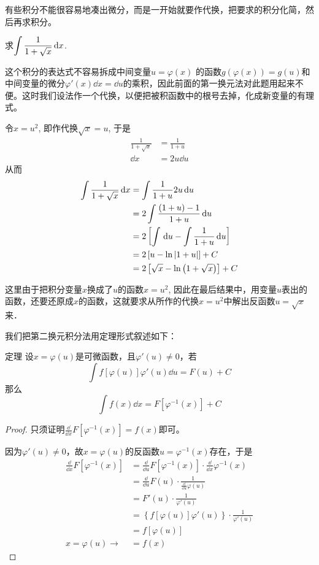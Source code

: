 有些积分不能很容易地凑出微分，而是一开始就要作代换，把要求的积分化简，然后再求积分。

\begin{example}
    求$\displaystyle\int \dfrac{1}{1+\sqrt{x}}\,{\rm d} x$.
\end{example}

\begin{solution}
    这个积分的表达式不容易拆成中间变量$u=\varphi(x)$
的函数$g(\varphi(x))=g(u)$和中间变量的微分$\varphi'(x)\dd x=\dd u$的乘积，因此前面的第一换元法对此题用起来不便。这时我们设法作一个代换，以便把被积函数中的根号去掉，化成新变量的有理式。

令$x=u^2$, 即作代换$\sqrt{x}=u$, 于是
\[\begin{split}
    \frac{1}{1+\sqrt{x}}&=\frac{1}{1+u}\\
    \dd x&=2u\dd u
\end{split}\]
从而
\[\begin{split}
    \displaystyle\int \dfrac{1}{1+\sqrt{x}}\,{\rm d} x&=\int \dfrac{1}{1+u}2u\,{\rm d} u\\
    &=2\int \dfrac{(1+u)-1}{1+u}\,{\rm d} u\\
    &=2\left[\int \,{\rm d} u-\int \dfrac{1}{1+u}\,{\rm d} u\right]\\
    &=2\left[u-\ln |1+u|\right]+C\\
    &=2\left[\sqrt{x}-\ln\left(1+\sqrt{x}\right)\right]+C
\end{split}\]
\end{solution}

这里由于把积分变量$x$换成了$u$的函数$x=u^2$, 因此在最后结果中，用变量$u$表出的函数，还要还原成$x$的函数，这就要求从所作的代换$x=u^2$中解出反函数$u=\sqrt{x}$来．

我们把第二换元积分法用定理形式叙述如下：

\begin{blk}{定理}
设$x=\varphi(u)$是可微函数，且$\varphi'(u)\ne 0$，若
\begin{equation}
    \int f[\varphi(u)]\varphi'(u)\dd u=F(u)+C
\end{equation}
那么
\begin{equation}
    \int f(x)\dd x=F\left[\varphi^{-1}(x)\right]+C
\end{equation}
\end{blk}

\begin{proof}
只须证明$\frac{\dd}{\dd x}F[\varphi^{-1}(x)]=f(x)$即可。

因为$\varphi'(u)\ne 0$，故$x=\varphi(u)$的反函数$u=\varphi^{-1}(x)$存在，于是
\[\begin{split}
    \frac{\dd}{\dd x}F[\varphi^{-1}(x)]&=\frac{\dd}{\dd u}F[\varphi^{-1}(x)]\cdot \frac{\dd }{\dd x}\varphi^{-1}(x)\\
    &=\frac{\dd}{\dd u}F(u)\cdot \frac{1}{\frac{\dd}{\dd u}\varphi(u)}\\
    &=F'(u)\cdot \frac{1}{\varphi'(u)}\\
    &=\left\{f[\varphi(u)]\varphi'(u)\right\}\cdot \frac{1}{\varphi'(u)}\\
    &=f[\varphi(u)]\\
    x=\varphi(u)\to &=f(x)
\end{split}\]
\end{proof}


